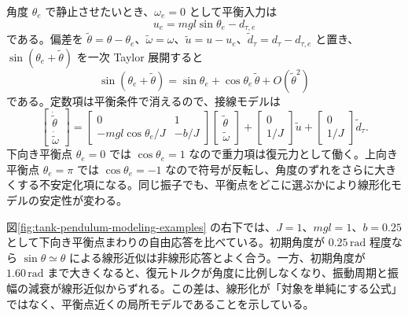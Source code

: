 角度 $\theta_e$ で静止させたいとき、$\omega_e=0$ として平衡入力は
\begin{equation}
  u_e=mgl\sin\theta_e-d_{\tau,e}
\end{equation}
である。偏差を $\tilde{\theta}=\theta-\theta_e$、$\tilde{\omega}=\omega$、$\tilde{u}=u-u_e$、$\tilde{d}_\tau=d_\tau-d_{\tau,e}$ と置き、$\sin(\theta_e+\tilde{\theta})$ を一次 Taylor 展開すると
\begin{equation}
  \sin(\theta_e+\tilde{\theta})
  =\sin\theta_e+\cos\theta_e\,\tilde{\theta}+O(\tilde{\theta}^2)
\end{equation}
である。定数項は平衡条件で消えるので、接線モデルは
\begin{equation}
  \begin{bmatrix}
    \dot{\tilde{\theta}}\\
    \dot{\tilde{\omega}}
  \end{bmatrix}
  =
  \begin{bmatrix}
    0&1\\
    -mgl\cos\theta_e/J&-b/J
  \end{bmatrix}
  \begin{bmatrix}
    \tilde{\theta}\\
    \tilde{\omega}
  \end{bmatrix}
  +\begin{bmatrix}0\\1/J\end{bmatrix}\tilde{u}
  +\begin{bmatrix}0\\1/J\end{bmatrix}\tilde{d}_\tau .
  \label{eq:pendulum-linearization}
\end{equation}
下向き平衡点 $\theta_e=0$ では $\cos\theta_e=1$ なので重力項は復元力として働く。上向き平衡点 $\theta_e=\pi$ では $\cos\theta_e=-1$ なので符号が反転し、角度のずれをさらに大きくする不安定化項になる。同じ振子でも、平衡点をどこに選ぶかにより線形化モデルの安定性が変わる。

図\ref{fig:tank-pendulum-modeling-examples} の右下では、$J=1$、$mgl=1$、$b=0.25$ として下向き平衡点まわりの自由応答を比べている。初期角度が $0.25\,\mathrm{rad}$ 程度なら $\sin\theta\simeq\theta$ による線形近似は非線形応答とよく合う。一方、初期角度が $1.60\,\mathrm{rad}$ まで大きくなると、復元トルクが角度に比例しなくなり、振動周期と振幅の減衰が線形近似からずれる。この差は、線形化が「対象を単純にする公式」ではなく、平衡点近くの局所モデルであることを示している。

